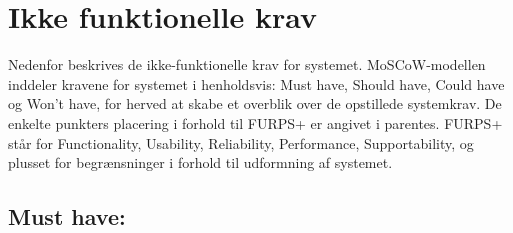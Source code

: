 \chapter{Ikke funktionelle krav}
Nedenfor beskrives de ikke-funktionelle krav for systemet. MoSCoW-modellen inddeler kravene for systemet i henholdsvis: Must have, Should have, Could have og Won’t have, for herved at skabe et overblik over de opstillede systemkrav. De enkelte punkters placering i forhold til FURPS+ er angivet i parentes.  FURPS+ står for Functionality, Usability, Reliability, Performance, Supportability, og plusset for begrænsninger i forhold til udformning af systemet.


\section{Must have:}
